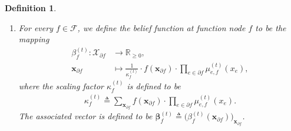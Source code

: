 \documentclass[journal]{IEEEtran}
\newtheorem{definition}[theorem]{Definition}
\newcommand{\vect}[1]{ \bm{#1} }
\newcommand{\beli}{\beta}
\newcommand{\vbeli}{ \vect{\beli} }
\newcommand{\setF}{ \mathcal{F} }
\newcommand{\setpf}{ \partial f }
\newcommand{\sR}{\mathbb{R}}
\newcommand{\xe}{ x_{e} }
\newcommand{\setxf}{ \mathcal{X}_{\setpf} }
\newcommand{\defeq}{ \triangleq }
\newcommand{\etof}{ e,f }
\newcommand{\xf}{ \bm{x}_{\setpf} }
\begin{document}
\begin{definition}
\begin{enumerate}
\begin{enumerate}
            \item\label{SPA: update belief functions} For every $f \in \setF$, we define the belief function at function node $f$ to be the mapping
                  \begin{align}
                    \beli_f^{(t)}: \setxf & \to \sR_{\geq 0}, \nonumber \\
                    \xf
                                          & \mapsto
                    \frac{1}{\kappa_f^{(t)}}
                    \cdot
                    f(\xf)
                    \cdot  \prod_{e \in \setpf}
                    \mu_{\etof}^{(t)}(\xe),
                    \label{sec:SNFG:eqn:1}
                  \end{align}
                  where the scaling factor $ \kappa_f^{(t)} $ is defined to be
                  \begin{align*}
                    \kappa_f^{(t)} \defeq
                    \sum_{ \xf }
                    f(\xf) \cdot \prod_{e \in \setpf} \mu_{\etof}^{(t)}(\xe).
                  \end{align*}
                  The associated vector is defined to be
                  $ \vbeli_{f}^{(t)} \defeq \bigl( \beli_f^{(t)}(\xf) \bigr)_{ \! \xf } $.


\end{enumerate}
\end{enumerate}
\end{definition}
\end{document}
